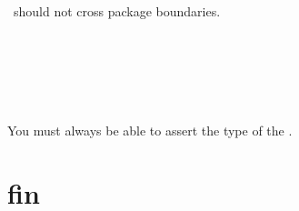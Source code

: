 \documentclass[xelatex,aspectratio=169]{beamer}
\begin{document}
\begin{frame}
		\inputminted{go}{example5.go}
\end{frame}

\section{}
\begin{frame}
	\Large
	\\
	\interface\ should not cross package boundaries.
\end{frame}

\section{}
\frame{\LARGE \sectionpage}

\begin{frame}
	\inputminted{go}{example6.go}
\end{frame}


\begin{frame}
	\inputminted{go}{example7.go}
\end{frame}

\section{}
\begin{frame}
	\Large
	\\
	You must always be able to assert the type of the \interface.
\end{frame}

\section{fin}
\end{document}
